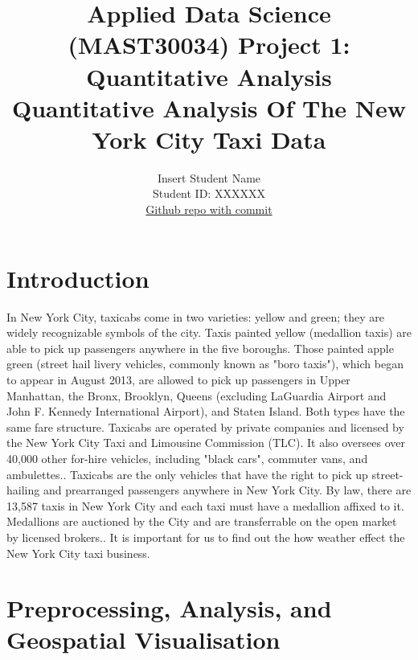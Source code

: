 \documentclass[11pt]{article}
\title{\textbf{Applied Data Science (MAST30034) Project 1: Quantitative Analysis} \\ Quantitative Analysis Of The New York City Taxi Data}
\author{
Insert Student Name \\
Student ID: XXXXXX \\
\href{https://github.com/MAST30034-Applied-Data-Science/mast30034\_p1\_template/tree/fd9f1dd17fdbcb5b119b70c93a22da8210d44fd7}{Github repo with commit}
}
\begin{document}
\maketitle

\section{Introduction}

In New York City, taxicabs come in two varieties: yellow and green; they are widely recognizable symbols of the city. Taxis painted yellow (medallion taxis) are able to pick up passengers anywhere in the five boroughs. Those painted apple green (street hail livery vehicles, commonly known as "boro taxis"), which began to appear in August 2013, are allowed to pick up passengers in Upper Manhattan, the Bronx, Brooklyn, Queens (excluding LaGuardia Airport and John F. Kennedy International Airport), and Staten Island. Both types have the same fare structure. Taxicabs are operated by private companies and licensed by the New York City Taxi and Limousine Commission (TLC). It also oversees over 40,000 other for-hire vehicles, including "black cars", commuter vans, and ambulettes.\cite{Taxis}.
Taxicabs are the only vehicles that have the right to pick up street-hailing and prearranged passengers anywhere in New York City. By law, there are 13,587 taxis in New York City and each taxi must have a medallion affixed to it. Medallions are auctioned by the City and are transferrable on the open market by licensed brokers.\cite{YellowCab}. It is important for us to find out the how weather effect the New York City taxi business.  


\section{Preprocessing, Analysis, and Geospatial Visualisation}
\end{document}
